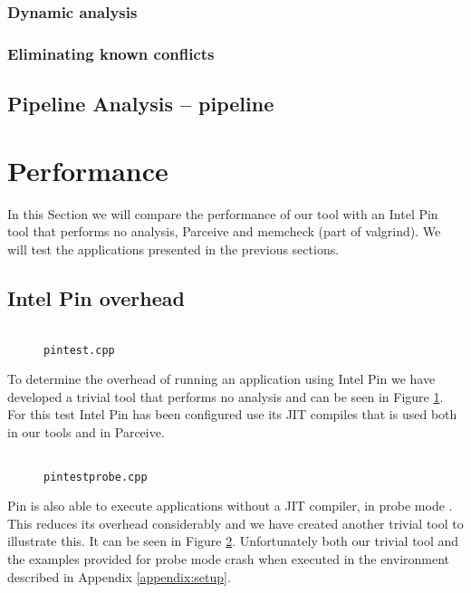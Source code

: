 \subsubsection*{Dynamic analysis}

\subsubsection*{Eliminating known conflicts}

\subsection {Pipeline Analysis -- pipeline}

\section{Performance}

In this Section we will compare the performance of our tool with an Intel Pin tool that performs no analysis, Parceive and memcheck (part of valgrind). We will test the applications presented in the previous sections.

\subsection{Intel Pin overhead}

\begin{figure}
	\begin{center}
		\inputminted[linenos, fontsize=\scriptsize]{c++}{../pintool/pintest.cpp}
	\end{center}
	\caption{\texttt{pintest.cpp}}
	\label{cap4:pintest}
\end{figure}

To determine the overhead of running an application using Intel Pin we have developed a trivial tool that performs no analysis and can be seen in Figure \ref{cap4:pintest}. For this test Intel Pin has been configured use its JIT compiles that is used both in our tools and in Parceive.

\begin{figure}
	\begin{center}
		\inputminted[linenos, fontsize=\scriptsize]{c++}{../pintool/pintestprobe.cpp}
	\end{center}
	\caption{\texttt{pintestprobe.cpp}}
	\label{cap4:pintestprobe}
\end{figure}

Pin is also able to execute applications without a JIT compiler, in probe mode \cite{pindoc}. This reduces its overhead considerably and we have created another trivial tool to illustrate this. It can be seen in Figure \ref{cap4:pintestprobe}. Unfortunately both our trivial tool and the examples provided for probe mode crash when executed in the environment described in Appendix \ref{appendix:setup}.

